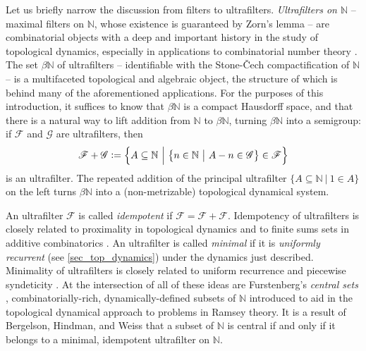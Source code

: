 \documentclass[letter,11pt]{article}
\theoremstyle{plain}
\theoremstyle{definition}
\theoremstyle{plain}
\theoremstyle{plain}
\numberwithin{equation}{section}
\newcommand{\Cech}{\v{C}ech}
\newcommand{\N}{\mathbb{N}}
\newcommand{\defeq}{\vcentcolon=}
\newcommand{\family}{\mathscr{F}}
\newcommand{\familytwo}{\mathscr{G}}
\begin{document}
Let us briefly narrow the discussion from filters to ultrafilters.  \emph{Ultrafilters on $\N$} -- maximal filters on $\N$, whose existence is guaranteed by Zorn's lemma -- are combinatorial objects with a deep and important history in the study of topological dynamics, especially in applications to combinatorial number theory \cite{bergelson_2010}. The set $\beta \N$ of ultrafilters -- identifiable with the Stone-\Cech{} compactification of $\N$ -- is a multifaceted topological and algebraic object, the structure of which is behind many of the aforementioned applications.  For the purposes of this introduction, it suffices to know that $\beta \N$ is a compact Hausdorff space, and that there is a natural way to lift addition from $\N$ to $\beta \N$, turning $\beta \N$ into a semigroup: if $\family$ and $\familytwo$ are ultrafilters, then
\begin{align}
\label{eqn_sum_of_families_intro}
    \family + \familytwo \defeq \Big\{ A \subseteq \N \ \Big| \ \big\{ n \in \N \ \big| \ A - n \in \familytwo \big\} \in \family \Big\}
\end{align}
is an ultrafilter.  The repeated addition of the principal ultrafilter $\{A \subseteq \N \ | \ 1 \in A\}$ on the left turns $\beta \N$ into a (non-metrizable) topological dynamical system.

An ultrafilter $\family$ is called \emph{idempotent} if $\family = \family + \family$.  Idempotency of ultrafilters is closely related to proximality in topological dynamics \cite[Sec. 19.3]{hindman_strauss_book_2012} and to finite sums sets in additive combinatorics \cite[Sec. 5.2]{hindman_strauss_book_2012}.  An ultrafilter is called \emph{minimal} if it is \emph{uniformly recurrent} (see \cref{sec_top_dynamics}) under the dynamics just described.  Minimality of ultrafilters is closely related to uniform recurrence \cite[Sec. 19.3]{hindman_strauss_book_2012} and piecewise syndeticity \cite[Sec. 4.4]{hindman_strauss_book_2012}.  At the intersection of all of these ideas are Furstenberg's \emph{central sets} \cite[Def. 8.3]{furstenberg_book_1981}, combinatorially-rich, dynamically-defined subsets of $\N$ introduced to aid in the topological dynamical approach to problems in Ramsey theory. It is a result of Bergelson, Hindman, and Weiss \cite{bergelson_hindman_1990} that a subset of $\N$ is central if and only if it belongs to a minimal, idempotent ultrafilter on $\N$.
\end{document}
